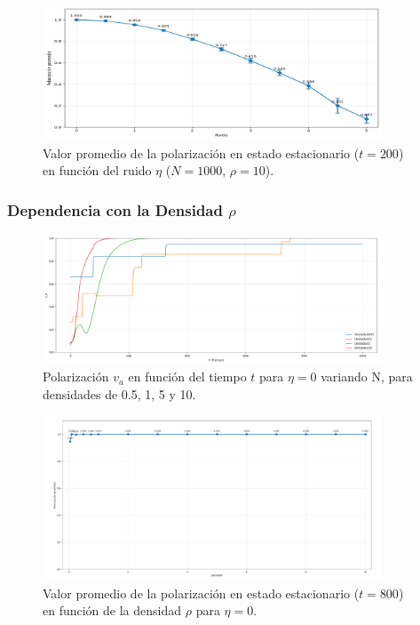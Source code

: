 \documentclass{article}
\begin{document}
\begin{figure}[H]
\centering
\includegraphics[width=0.9\textwidth]{promedio_polarizacion_ruido_promedio2.png}
\caption{Valor promedio de la polarización en estado estacionario ($t=200$) en función del ruido $\eta$ ($N = 1000$, $\rho = 10$).}
\label{fig:promedio_va_eta_promedio2}
\end{figure}

\subsubsection{Dependencia con la Densidad $\rho$}
\begin{figure}[H]
\centering
\includegraphics[width=0.9\textwidth]{17.png}
\caption{Polarización $v_a$ en función del tiempo $t$ para $\eta = 0$ variando N, para densidades de 0.5, 1, 5 y 10.}
\label{fig:17}
\end{figure}

\begin{figure}[H]
\centering
\includegraphics[width=0.9\textwidth]{18.png}
\caption{Valor promedio de la polarización en estado estacionario ($t = 800$) en función de la densidad $\rho$ para $\eta = 0$.}
\label{fig:18}
\end{figure}
\end{document}
